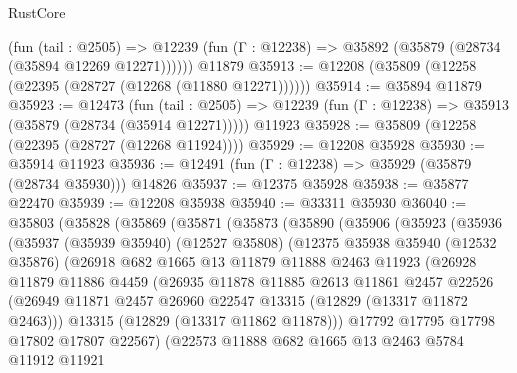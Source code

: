 \begin{lexlean}{RustCore}
\begin{coremodule}
      (fun (tail : @2505) =>
      @12239 (fun (Γ : @12238) => @35892 (@35879 (@28734 (@35894 @12269 @12271))))))
    @11879
@35913 := @12208 (@35809 (@12258 (@22395 (@28727 (@12268 (@11880 @12271))))))
@35914 := @35894 @11879
@35923 := @12473
    (fun (tail : @2505) => @12239 (fun (Γ : @12238) => @35913 (@35879 (@28734 (@35914 @12271)))))
    @11923
@35928 := @35809 (@12258 (@22395 (@28727 (@12268 @11924))))
@35929 := @12208 @35928
@35930 := @35914 @11923
@35936 := @12491 (fun (Γ : @12238) => @35929 (@35879 (@28734 @35930))) @14826
@35937 := @12375 @35928
@35938 := @35877 @22470
@35939 := @12208 @35938
@35940 := @33311 @35930
@36040 := @35803
    (@35828
      (@35869
        (@35871
          (@35873
            (@35890
              (@35906
                (@35923
                  (@35936
                    (@35937
                      (@35939 @35940)
                      (@12527 @35808)
                      (@12375
                        @35938
                        @35940
                        (@12532 @35876)
                        (@26918
                          @682
                          @1665
                          @13
                          @11879
                          @11888
                          @2463
                          @11923
                          (@26928
                            @11879
                            @11886
                            @4459
                            (@26935
                              @11878
                              @11885
                              @2613
                              @11861
                              @2457
                              @22526
                              (@26949
                                @11871
                                @2457
                                @26960
                                @22547
                                @13315
                                (@12829 (@13317 @11872 @2463)))
                              @13315
                              (@12829 (@13317 @11862 @11878)))
                            @17792
                            @17795
                            @17798
                            @17802
                            @17807
                            @22567)
                          (@22573
                            @11888
                            @682
                            @1665
                            @13
                            @2463
                            @5784
                            @11912
                            @11921

\end{coremodule}
\end{lexlean}
